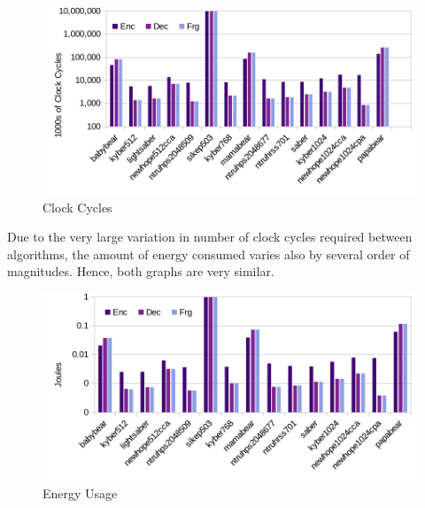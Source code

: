 \documentclass[10pt]{article}
\begin{document}
\begin{figure}[ht]
    \centering
    \includegraphics[scale=0.8]{./figures/clock.pdf}
    \caption{Clock Cycles}
    \label{fig:clock}
\end{figure}

Due to the very large variation in number of clock cycles required between algorithms, 
the amount of energy consumed varies also by several order of magnitudes. Hence, both
graphs are very similar.

\begin{figure}[ht]
    \centering
    \includegraphics[scale=0.8]{./figures/energy.pdf}
    \caption{Energy Usage}
    \label{fig:energ}
\end{figure}



\end{document}

